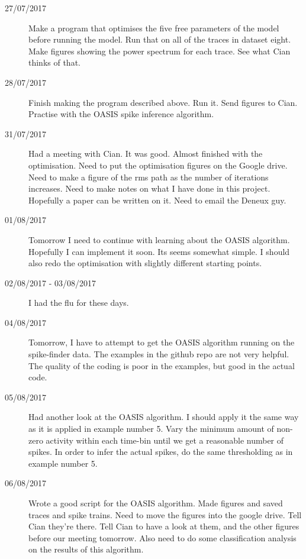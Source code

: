\documentclass[a4paper,12pt]{article}
\theoremstyle{definition}
\begin{document}
\begin{description}
	\item[27/07/2017] Make a program that optimises the five free parameters of the model before running the model. Run that on all of the traces in dataset eight. Make figures showing the power spectrum for each trace. See what Cian thinks of that.

  \item[28/07/2017] Finish making the program described above. Run it. Send figures to Cian. Practise with the OASIS spike inference algorithm.

  \item[31/07/2017] Had a meeting with Cian. It was good. Almost finished with the optimisation. Need to put the optimisation figures on the Google drive. Need to make a figure of the rms path as the number of iterations increases. Need to make notes on what I have done in this project. Hopefully a paper can be written on it. Need to email the Deneux guy.

  \item[01/08/2017] Tomorrow I need to continue with learning about the OASIS algorithm. Hopefully I can implement it soon. Its seems somewhat simple. I should also redo the optimisation with slightly different starting points.

  \item[02/08/2017 - 03/08/2017] I had the flu for these days.

  \item[04/08/2017] Tomorrow, I have to attempt to get the OASIS algorithm running on the spike-finder data. The examples in the github repo are not very helpful. The quality of the coding is poor in the examples, but good in the actual code.

  \item[05/08/2017] Had another look at the OASIS algorithm. I should apply it the same way as it is applied in example number 5. Vary the minimum amount of non-zero activity within each time-bin until we get a reasonable number of spikes. In order to infer the actual spikes, do the same thresholding as in example number 5.

  \item[06/08/2017] Wrote a good script for the OASIS algorithm. Made figures and saved traces and spike trains. Need to move the figures into the google drive. Tell Cian they're there. Tell Cian to have a look at them, and the other figures before our meeting tomorrow. Also need to do some classification analysis on the results of this algorithm.


\end{description}
\end{document}
